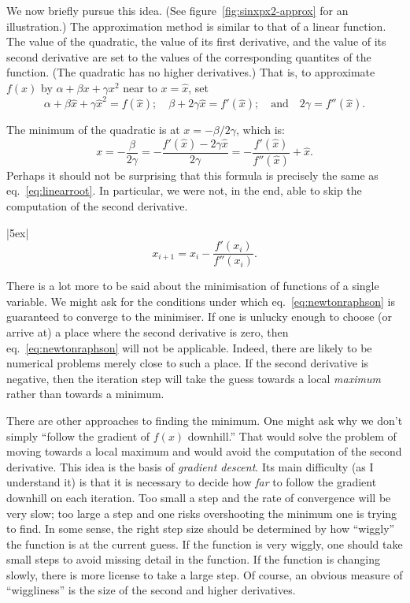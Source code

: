 \documentclass[10pt, a4paper]{article}
\begin{document}
We now briefly pursue this idea. (See figure~\ref{fig:sinxpx2-approx}
for an illustration.) The approximation method is similar to that of a
linear function. The value of the quadratic, the value of its first
derivative, and the value of its second derivative are set to the
values of the corresponding quantites of the function. (The quadratic
has no higher derivatives.) That is, to approximate $f(x)$ by
$\alpha+\beta x+\gamma x^2$ near to $x=\hat{x}$, set
\begin{equation*}
  \alpha +\beta\hat{x} + \gamma\hat{x}^2 = f(\hat{x});\quad
  \beta +2\gamma\hat{x} = f'(\hat{x});\quad\text{and}\quad
  2\gamma = f''(\hat{x}).
\end{equation*}

The minimum of the quadratic is at $x=-\beta/2\gamma$, which is:
\begin{equation*}
  x = -\frac{\beta}{2\gamma}
  = -\frac{f'(\hat{x})-2\gamma\hat{x}}{2\gamma}
  = -\frac{f'(\hat{x})}{f''(\hat{x})} +\hat{x}. 
\end{equation*}
Perhaps it should not be surprising that this formula is precisely the
same as eq.~\eqref{eq:linearroot}. In particular, we were not, in the
end, able to skip the computation of the second derivative.

\begin{marginfigure}|5ex|
  \begin{equation*}
    x_{i+1} = x_i - \frac{f'(x_i)}{f''(x_i)}.
  \end{equation*}
\end{marginfigure}
There is a lot more to be said about the minimisation of functions of
a single variable. We might ask for the conditions under which
eq.~\eqref{eq:newtonraphson} is guaranteed to converge to the
minimiser. If one is unlucky enough to choose (or arrive at) a place
where the second derivative is zero, then eq.~\eqref{eq:newtonraphson}
will not be applicable. Indeed, there are likely to be numerical
problems merely close to such a place. If the second derivative is
negative, then the iteration step will take the guess towards a local
\emph{maximum} rather than towards a minimum.

There are other approaches to finding the minimum. One might ask why
we don't simply ``follow the gradient of $f(x)$ downhill.'' That would
solve the problem of moving towards a local maximum and would avoid
the computation of the second derivative. This idea is the basis of
\emph{gradient descent}. Its main difficulty (as I understand it) is
that it is necessary to decide how \emph{far} to follow the gradient
downhill on each iteration. Too small a step and the rate of
convergence will be very slow; too large a step and one risks
overshooting the minimum one is trying to find. In some sense, the
right step size should be determined by how “wiggly” the function is
at the current guess. If the function is very wiggly, one should take
small steps to avoid missing detail in the function. If the function
is changing slowly, there is more license to take a large step. Of
course, an obvious measure of “wiggliness” is the size of the second
and higher derivatives.
\end{document}
